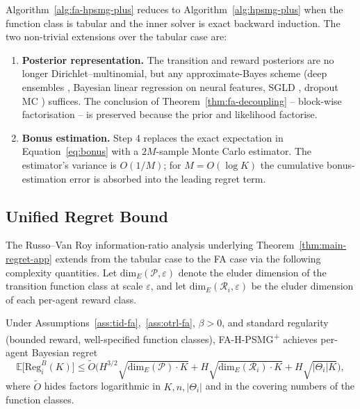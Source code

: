 Algorithm~\ref{alg:fa-hpsmg-plus} reduces to Algorithm~\ref{alg:hpsmg-plus} when the function class is tabular and the inner solver is exact backward induction. The two non-trivial extensions over the tabular case are:
\begin{enumerate}
\item \textbf{Posterior representation.} The transition and reward posteriors are no longer Dirichlet--multinomial, but any approximate-Bayes scheme (deep ensembles \citep{lakshminarayanan2017simple}, Bayesian linear regression on neural features, SGLD \citep{welling2011bayesian}, dropout MC \citep{gal2016dropout}) suffices. The conclusion of Theorem~\ref{thm:fa-decoupling} -- block-wise factorisation -- is preserved because the prior and likelihood factorise.
\item \textbf{Bonus estimation.} Step 4 replaces the exact expectation in Equation~\eqref{eq:bonus} with a $2M$-sample Monte Carlo estimator. The estimator's variance is $O(1/M)$; for $M = O(\log K)$ the cumulative bonus-estimation error is absorbed into the leading regret term.
\end{enumerate}

\subsection{Unified Regret Bound}
\label{app:fa-regret}

The Russo--Van Roy information-ratio analysis underlying Theorem~\ref{thm:main-regret-app} extends from the tabular case to the FA case via the following complexity quantities. Let $\mathrm{dim}_E(\mathcal{P}, \varepsilon)$ denote the eluder dimension \citep{russo2014learning} of the transition function class at scale $\varepsilon$, and let $\mathrm{dim}_E(\mathcal{R}_i, \varepsilon)$ be the eluder dimension of each per-agent reward class.

\begin{theorem}
\label{thm:fa-regret-informal}
Under Assumptions~\ref{ass:tid-fa},~\ref{ass:otrl-fa}, $\beta > 0$, and standard regularity (bounded reward, well-specified function classes), FA-H-PSMG\textsuperscript{+} achieves per-agent Bayesian regret
\begin{equation}
\label{eq:fa-regret}
\mathbb{E}\big[\mathrm{Reg}_i^B(K)\big] \leq \tilde O\Big(H^{3/2} \sqrt{\mathrm{dim}_E(\mathcal{P}) \cdot K} + H \sqrt{\mathrm{dim}_E(\mathcal{R}_i) \cdot K} + H\sqrt{|\Theta_i| K}\Big),
\end{equation}
where $\tilde O$ hides factors logarithmic in $K, n, |\Theta_i|$ and in the covering numbers of the function classes.
\end{theorem}

